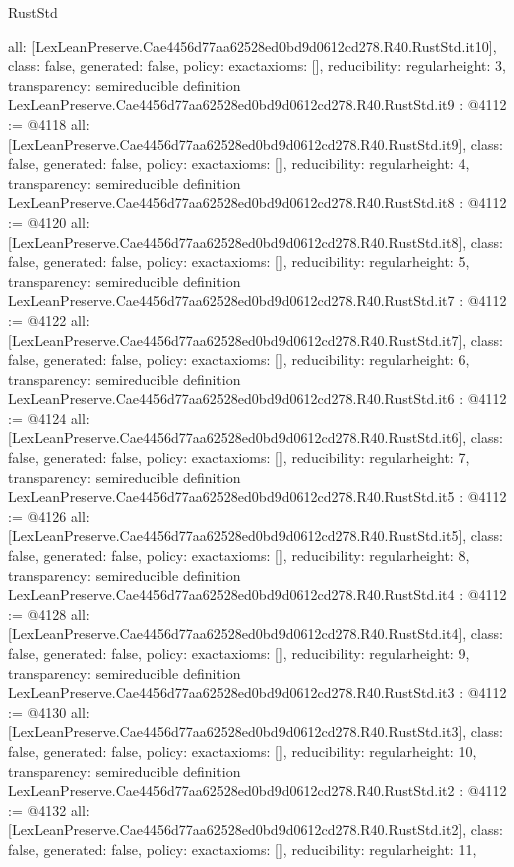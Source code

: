 \begin{lexlean}{RustStd}
\begin{coremodule}
{  all: [LexLeanPreserve.Cae4456d77aa62528ed0bd9d0612cd278.R40.RustStd.it10],
  class: false,
  generated: false,
  policy: exact{axioms: []},
  reducibility: regular{height: 3},
  transparency: semireducible
}
definition LexLeanPreserve.Cae4456d77aa62528ed0bd9d0612cd278.R40.RustStd.it9 : @4112 := @4118 {
  all: [LexLeanPreserve.Cae4456d77aa62528ed0bd9d0612cd278.R40.RustStd.it9],
  class: false,
  generated: false,
  policy: exact{axioms: []},
  reducibility: regular{height: 4},
  transparency: semireducible
}
definition LexLeanPreserve.Cae4456d77aa62528ed0bd9d0612cd278.R40.RustStd.it8 : @4112 := @4120 {
  all: [LexLeanPreserve.Cae4456d77aa62528ed0bd9d0612cd278.R40.RustStd.it8],
  class: false,
  generated: false,
  policy: exact{axioms: []},
  reducibility: regular{height: 5},
  transparency: semireducible
}
definition LexLeanPreserve.Cae4456d77aa62528ed0bd9d0612cd278.R40.RustStd.it7 : @4112 := @4122 {
  all: [LexLeanPreserve.Cae4456d77aa62528ed0bd9d0612cd278.R40.RustStd.it7],
  class: false,
  generated: false,
  policy: exact{axioms: []},
  reducibility: regular{height: 6},
  transparency: semireducible
}
definition LexLeanPreserve.Cae4456d77aa62528ed0bd9d0612cd278.R40.RustStd.it6 : @4112 := @4124 {
  all: [LexLeanPreserve.Cae4456d77aa62528ed0bd9d0612cd278.R40.RustStd.it6],
  class: false,
  generated: false,
  policy: exact{axioms: []},
  reducibility: regular{height: 7},
  transparency: semireducible
}
definition LexLeanPreserve.Cae4456d77aa62528ed0bd9d0612cd278.R40.RustStd.it5 : @4112 := @4126 {
  all: [LexLeanPreserve.Cae4456d77aa62528ed0bd9d0612cd278.R40.RustStd.it5],
  class: false,
  generated: false,
  policy: exact{axioms: []},
  reducibility: regular{height: 8},
  transparency: semireducible
}
definition LexLeanPreserve.Cae4456d77aa62528ed0bd9d0612cd278.R40.RustStd.it4 : @4112 := @4128 {
  all: [LexLeanPreserve.Cae4456d77aa62528ed0bd9d0612cd278.R40.RustStd.it4],
  class: false,
  generated: false,
  policy: exact{axioms: []},
  reducibility: regular{height: 9},
  transparency: semireducible
}
definition LexLeanPreserve.Cae4456d77aa62528ed0bd9d0612cd278.R40.RustStd.it3 : @4112 := @4130 {
  all: [LexLeanPreserve.Cae4456d77aa62528ed0bd9d0612cd278.R40.RustStd.it3],
  class: false,
  generated: false,
  policy: exact{axioms: []},
  reducibility: regular{height: 10},
  transparency: semireducible
}
definition LexLeanPreserve.Cae4456d77aa62528ed0bd9d0612cd278.R40.RustStd.it2 : @4112 := @4132 {
  all: [LexLeanPreserve.Cae4456d77aa62528ed0bd9d0612cd278.R40.RustStd.it2],
  class: false,
  generated: false,
  policy: exact{axioms: []},
  reducibility: regular{height: 11},
}
\end{coremodule}
\end{lexlean}
